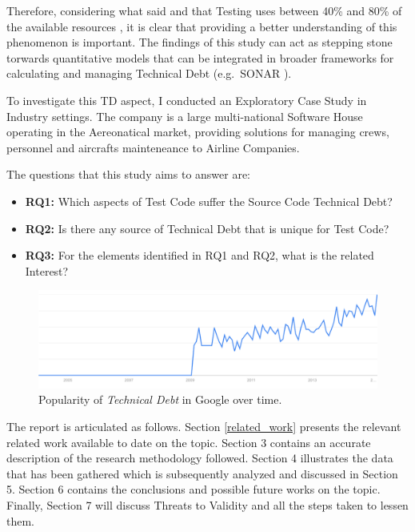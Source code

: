 Therefore, considering what said and that Testing uses between 40\% and 80\% of the available resources \cite{exploratorying_testing_td}, it is clear that providing a better understanding of this phenomenon is important. The findings of this study can act as stepping stone torwards quantitative models that can be integrated in broader frameworks for calculating and managing Technical Debt (e.g.\ SONAR \cite{sonar_evaluate_td}).

To investigate this TD aspect, I conducted an Exploratory Case Study in Industry settings. The company is a large multi-national Software House operating in the Aereonatical market, providing solutions for managing crews, personnel and aircrafts mainteneance to Airline Companies.

The questions that this study aims to answer are:
\begin{itemize}
    \itemsep0em 
    \item \textbf{RQ1:} Which aspects of Test Code suffer the Source Code Technical Debt?
    \item \textbf{RQ2:} Is there any source of Technical Debt that is unique for Test Code?
    \item \textbf{RQ3:} For the elements identified in RQ1 and RQ2, what is the related Interest?
\end{itemize}


\begin{figure}[h]
    \centering
    \includegraphics[width=\textwidth]{figure/technicalDebt.pdf}
    \caption{Popularity of \textit{Technical Debt} in Google over time.}
    \label{fig:technical_debt_trend}
\end{figure}

The report is articulated as follows. Section \ref{related_work} presents the relevant related work available to date on the topic. Section 3 contains an accurate description of the research methodology followed. Section 4 illustrates the data that has been gathered which is subsequently analyzed and discussed in Section 5. Section 6 contains the conclusions and possible future works on the topic. Finally, Section 7 will discuss Threats to Validity and all the steps taken to lessen them.
